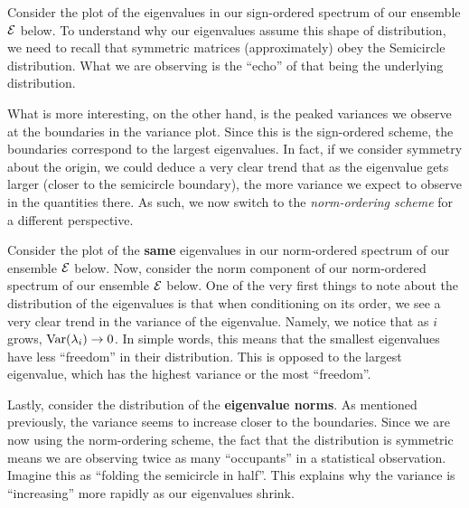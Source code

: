 Consider the plot of the eigenvalues in our sign-ordered spectrum of our ensemble $\mathcal{E}$ below. To understand why our eigenvalues assume this shape of distribution, we need to recall that symmetric matrices (approximately) obey the Semicircle distribution. What we are observing is the ``echo'' of that being the underlying distribution.

What is more interesting, on the other hand, is the peaked variances we observe at the boundaries in the variance plot. Since this is the sign-ordered scheme, the boundaries correspond to the largest eigenvalues. In fact, if we consider symmetry about the origin, we could deduce a very clear trend that as the eigenvalue gets larger (closer to the semicircle boundary), the more variance we expect to observe in the quantities there. As such, we now switch to the \textit{norm-ordering scheme} for a different perspective.

\trim
{}%

\newpage

Consider the plot of the \textbf{same} eigenvalues in our norm-ordered spectrum of our ensemble $\mathcal{E}$ below.
Now, consider the norm component of our norm-ordered spectrum of our ensemble $\mathcal{E}$ below. One of the very first things to note about the distribution of the eigenvalues is that when conditioning on its order, we see a very clear trend in the variance of the eigenvalue. Namely, we notice that as $i$ grows, $\text{Var}(\lambda_i) \to 0$. In simple words, this means that the smallest eigenvalues have less ``freedom'' in their distribution. This is opposed to the largest eigenvalue, which has the highest variance or the most ``freedom''.

\trim
{}%

\newpage

Lastly, consider the distribution of the \textbf{eigenvalue norms}. As mentioned previously, the variance seems to increase closer to the boundaries. Since we are now using the norm-ordering scheme, the fact that the distribution is symmetric means we are observing twice as many ``occupants'' in a statistical observation. Imagine this as ``folding the semicircle in half''. This explains why the variance is ``increasing'' more rapidly as our eigenvalues shrink.

